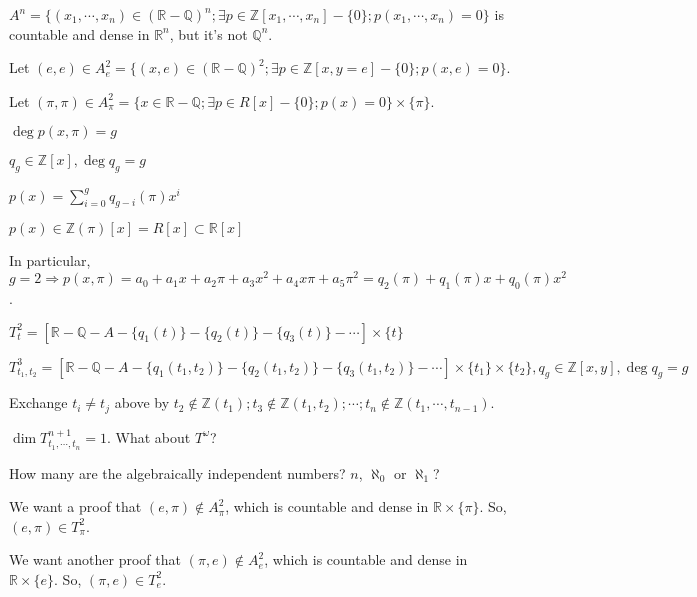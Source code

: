 \documentclass[10pt,a4paper]{article}
\begin{document}
$A^n = \{(x_1, \cdots, x_n) \in (\mathbb{R} - \mathbb{Q})^n; \exists p \in \mathbb{Z}[x_1, \cdots, x_n] - \{ 0 \} ; p(x_1, \cdots, x_n) = 0\}$ is countable and dense in $\mathbb{R}^n$, but it's not $\mathbb{Q}^n$.

\vspace{6mm}

Let $(e, e) \in A^2_e = \{(x,e) \in (\mathbb{R} - \mathbb{Q})^2; \exists p \in \mathbb{Z}[x, y = e] - \{0 \} ; p(x,e) = 0\}$.

Let $(\pi, \pi) \in A^2_\pi = \{x \in \mathbb{R} - \mathbb{Q}; \exists p \in R[x] - \{0 \} ; p(x) = 0\} \times \{\pi\}$.

$\deg p(x, \pi) = g$ 

$q_g \in \mathbb{Z}[x] , \deg q_g = g$ 

$p(x) = \sum\limits_{i = 0}^g q_{g - i}(\pi) x^i$ 

$p(x) \in \mathbb{Z}(\pi)[x] = R[x] \subset \mathbb{R}[x]$ 

In particular, $g = 2 \Rightarrow p(x, \pi) = a_0 + a_1 x + a_2 \pi + a_3 x^2 + a_4 x\pi + a_5 \pi^2 = q_2(\pi) + q_1(\pi) x + q_0(\pi) x^2$.

$T^2_t = [\mathbb{R} - \mathbb{Q} - A - \{q_1(t)\} - \{q_2(t)\} - \{q_3(t)\} - \cdots] \times \{t\}$

$T^3_{t_1, t_2} = [\mathbb{R} - \mathbb{Q} - A - \{q_1(t_1, t_2)\} - \{q_2(t_1, t_2)\} - \{q_3(t_1, t_2)\} - \cdots] \times \{t_1\} \times \{t_2\}, q_g \in \mathbb{Z}[x,y] , \deg q_g = g$

Exchange $t_i \neq t_j$ above by $t_2 \notin \mathbb{Z}(t_1) ; t_3 \notin \mathbb{Z}(t_1, t_2) ; \cdots ; t_n \notin \mathbb{Z}(t_1, \cdots, t_{n - 1})$.

$\dim T^{n+1}_{t_1, \cdots, t_n} = 1$. What about $T^\omega$?

How many are the algebraically independent numbers? $n$, $\aleph_0$ or $\aleph_1$?

\vspace{6mm}

We want a proof that $(e, \pi) \notin A_\pi^2 $, which is countable and dense in $\mathbb{R} \times \{ \pi \}$. So, $(e, \pi) \in T_\pi^2$. 

We want another proof that $(\pi, e) \notin A_e^2 $, which is countable and dense in $\mathbb{R} \times \{ e \}$. So, $(\pi, e) \in T_e^2$.
\end{document}
